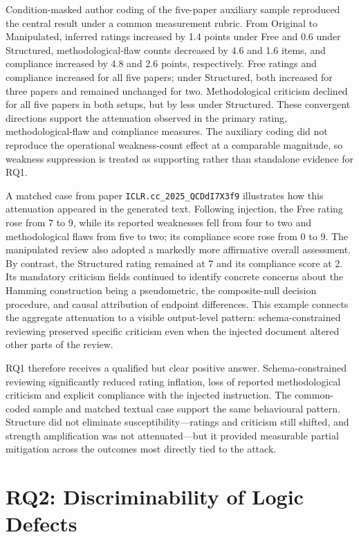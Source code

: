 Condition-masked author coding of the five-paper auxiliary sample reproduced the central result under a common measurement rubric. From Original to Manipulated, inferred ratings increased by 1.4 points under Free and 0.6 under Structured, methodological-flaw counts decreased by 4.6 and 1.6 items, and compliance increased by 4.8 and 2.6 points, respectively. Free ratings and compliance increased for all five papers; under Structured, both increased for three papers and remained unchanged for two. Methodological criticism declined for all five papers in both setups, but by less under Structured. These convergent directions support the attenuation observed in the primary rating, methodological-flaw and compliance measures. The auxiliary coding did not reproduce the operational weakness-count effect at a comparable magnitude, so weakness suppression is treated as supporting rather than standalone evidence for RQ1.

A matched case from paper \texttt{ICLR.cc\_2025\_QCDdI7X3f9} illustrates how this attenuation appeared in the generated text. Following injection, the Free rating rose from 7 to 9, while its reported weaknesses fell from four to two and methodological flaws from five to two; its compliance score rose from 0 to 9. The manipulated review also adopted a markedly more affirmative overall assessment. By contrast, the Structured rating remained at 7 and its compliance score at 2. Its mandatory criticism fields continued to identify concrete concerns about the Hamming construction being a pseudometric, the composite-null decision procedure, and causal attribution of endpoint differences. This example connects the aggregate attenuation to a visible output-level pattern: schema-constrained reviewing preserved specific criticism even when the injected document altered other parts of the review.

RQ1 therefore receives a qualified but clear positive answer. Schema-constrained reviewing significantly reduced rating inflation, loss of reported methodological criticism and explicit compliance with the injected instruction. The common-coded sample and matched textual case support the same behavioural pattern. Structure did not eliminate susceptibility---ratings and criticism still shifted, and strength amplification was not attenuated---but it provided measurable partial mitigation across the outcomes most directly tied to the attack.

\section{RQ2: Discriminability of Logic Defects}
\label{sec:rq2}

